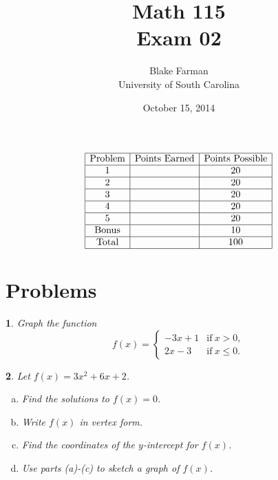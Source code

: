 \documentclass[12pt]{amsart}
\author{Blake Farman\\University of South Carolina}
\title{Math 115\\ Exam 02}
\date{October 15, 2014}
\begin{document}
\maketitle

\begin{center}
\end{center}

\vspace{0.2in}
\vspace{0.2in}

\theoremstyle{plain}
\newtheorem{thm}{}
\newtheorem{lem}{Lemma}
\theoremstyle{definition}
\newtheorem{defn}{Definition}

$$
\begin{array}{|c|c|c|}
  \hline
  \text{Problem} & \text{Points Earned} & \text{Points Possible}\\
  \hline
  1 & & 20\\
  \hline
  2 & & 20\\
  \hline
  3 & & 20\\
  \hline
  4 & & 20\\
  \hline
  5 & & 20\\
  \hline
  \text{Bonus} & & 10\\
  \hline
  \text{Total} & & 100\\
  \hline
\end{array}
$$

\newpage

\section{Problems}

\begin{thm}
  Graph the function
  $$f(x) = \left\{
  \begin{array}{cc}
    -3x + 1 & \text{if}\ x > 0,\\
    2x - 3 & \text{if}\ x \leq 0.
  \end{array}
  \right.
  $$
\end{thm}

\newpage
\begin{thm}
  Let $f(x) = 3x^2 + 6x + 2$.
  \begin{enumerate}[(a)]
  \item
    Find the solutions to $f(x) = 0$.
    \vspace{2in}
  \item
    Write $f(x)$ in vertex form.
    \vspace{2in}
  \item
    Find the coordinates of the $y$-intercept for $f(x)$.
    \vspace{2in}
  \item
    Use parts (a)-(c) to sketch a graph of $f(x)$.
  \end{enumerate}
\end{thm}
\end{document}
